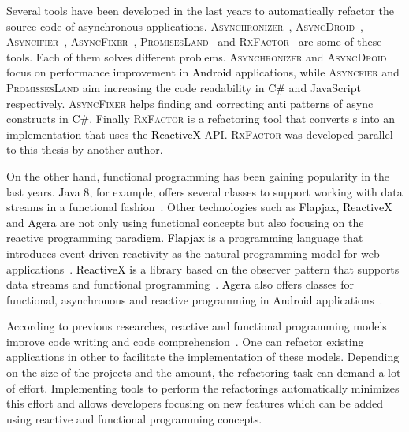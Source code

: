\documentclass[type=bsc,accentcolor=tud9c]{tudthesis}
\newcommand{\framework}[1]{\textcolor{black}{#1}}
\begin{document}
Several tools have been developed in the last years to automatically refactor the source code of asynchronous applications. \textsc{Asynchronizer}~\cite{paperRetrofittingConcurrency}, \textsc{AsyncDroid}~\cite{paperStudyRefactoring}, \textsc{Asyncifier}~\cite{paperAsyncMobile}, \textsc{AsyncFixer}~\cite{paperAsyncMobile}, \textsc{PromisesLand}~\cite{thesisJavaScript} and \textsc{RxFactor}~\cite{thesisRxFactor} are some of these tools. Each of them solves different problems. \textsc{Asynchronizer} and \textsc{AsyncDroid} focus on performance improvement in \framework{Android} applications, while \textsc{Asyncfier} and \textsc{PromissesLand} aim increasing the code readability in \framework{C\#} and \framework{JavaScript} respectively. \textsc{AsyncFixer} helps finding and correcting anti patterns of async constructs in \framework{C\#}. Finally \textsc{RxFactor} is a refactoring tool that converts s into an implementation that uses the \framework{ReactiveX} API. \textsc{RxFactor} was developed parallel to this thesis by another author.

On the other hand, functional programming has been gaining popularity in the last years. \framework{Java 8}, for example, offers several classes to support working with data streams in a functional fashion~\cite{bookJava8Streams}. Other technologies such as \framework{Flapjax}, \framework{ReactiveX} and \framework{Agera} are not only using functional concepts but also focusing on the reactive programming paradigm. \framework{Flapjax} is a programming language that introduces event-driven reactivity as the natural programming model for web applications~\cite{paperFlapjax}. \framework{ReactiveX} is a library based on the observer pattern that supports data streams and functional programming~\cite{reactiveX}. \framework{Agera} also offers classes for functional, asynchronous and reactive programming in \framework{Android} applications~\cite{agera}.

According to previous researches, reactive and functional programming models improve code writing and code comprehension~\cite{promises, paperReactiveComprehension}. One can refactor existing applications in other to facilitate the implementation of these models. Depending on the size of the projects and the amount, the refactoring task can demand a lot of effort. Implementing tools to perform the refactorings automatically minimizes this effort and allows developers focusing on new features which can be added using reactive and functional programming concepts.
\end{document}
